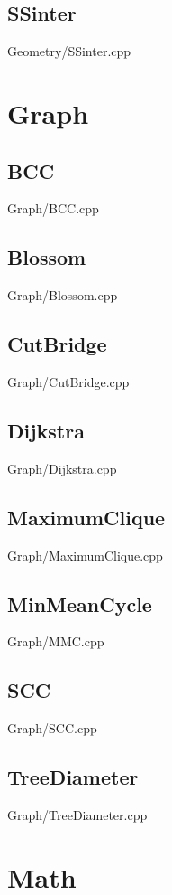     \subsection{SSinter}
         {Geometry/SSinter.cpp}

\section{Graph}
    \subsection{BCC}
         {Graph/BCC.cpp}
    \subsection{Blossom}
         {Graph/Blossom.cpp}
    \subsection{CutBridge}
         {Graph/CutBridge.cpp}
    \subsection{Dijkstra}
         {Graph/Dijkstra.cpp}
    \subsection{MaximumClique}
         {Graph/MaximumClique.cpp}
    \subsection{MinMeanCycle}
         {Graph/MMC.cpp}
    \subsection{SCC}
         {Graph/SCC.cpp}
    \subsection{TreeDiameter}
         {Graph/TreeDiameter.cpp}

\section{Math}
